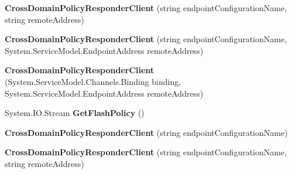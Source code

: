\begin{DoxyCompactItemize}
\item 
\hypertarget{class_tripi_w_c_f_1_1_client_mockup_1_1_proxy_1_1_cross_domain_policy_responder_client_a2ff9ef3fbb572c6ed3b4f1fd0c9647f6}{
{\bfseries CrossDomainPolicyResponderClient} (string endpointConfigurationName, string remoteAddress)}
\label{class_tripi_w_c_f_1_1_client_mockup_1_1_proxy_1_1_cross_domain_policy_responder_client_a2ff9ef3fbb572c6ed3b4f1fd0c9647f6}

\item 
\hypertarget{class_tripi_w_c_f_1_1_client_mockup_1_1_proxy_1_1_cross_domain_policy_responder_client_a8c20d5420735a3405736fc8f579a6f59}{
{\bfseries CrossDomainPolicyResponderClient} (string endpointConfigurationName, System.ServiceModel.EndpointAddress remoteAddress)}
\label{class_tripi_w_c_f_1_1_client_mockup_1_1_proxy_1_1_cross_domain_policy_responder_client_a8c20d5420735a3405736fc8f579a6f59}

\item 
\hypertarget{class_tripi_w_c_f_1_1_client_mockup_1_1_proxy_1_1_cross_domain_policy_responder_client_a25830c515ea9a9a917bdbfb0f93fe948}{
{\bfseries CrossDomainPolicyResponderClient} (System.ServiceModel.Channels.Binding binding, System.ServiceModel.EndpointAddress remoteAddress)}
\label{class_tripi_w_c_f_1_1_client_mockup_1_1_proxy_1_1_cross_domain_policy_responder_client_a25830c515ea9a9a917bdbfb0f93fe948}

\item 
\hypertarget{class_tripi_w_c_f_1_1_client_mockup_1_1_proxy_1_1_cross_domain_policy_responder_client_a0246400572a505db33fd2489f6d879af}{
System.IO.Stream {\bfseries GetFlashPolicy} ()}
\label{class_tripi_w_c_f_1_1_client_mockup_1_1_proxy_1_1_cross_domain_policy_responder_client_a0246400572a505db33fd2489f6d879af}

\item 
\hypertarget{class_tripi_w_c_f_1_1_client_mockup_1_1_proxy_1_1_cross_domain_policy_responder_client_a1c3e714c69ed57a59bdb3b75795580af}{
{\bfseries CrossDomainPolicyResponderClient} (string endpointConfigurationName)}
\label{class_tripi_w_c_f_1_1_client_mockup_1_1_proxy_1_1_cross_domain_policy_responder_client_a1c3e714c69ed57a59bdb3b75795580af}

\item 
\hypertarget{class_tripi_w_c_f_1_1_client_mockup_1_1_proxy_1_1_cross_domain_policy_responder_client_a2ff9ef3fbb572c6ed3b4f1fd0c9647f6}{
{\bfseries CrossDomainPolicyResponderClient} (string endpointConfigurationName, string remoteAddress)}
\label{class_tripi_w_c_f_1_1_client_mockup_1_1_proxy_1_1_cross_domain_policy_responder_client_a2ff9ef3fbb572c6ed3b4f1fd0c9647f6}


\end{DoxyCompactItemize}
